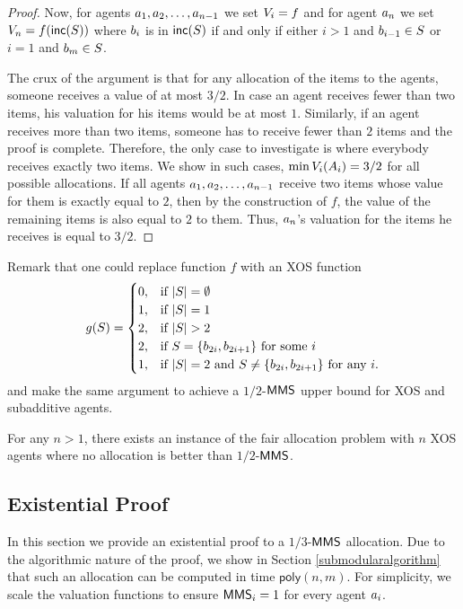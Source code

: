 \begin{proof}
	 Now, for agents $a_1, a_2, \ldots, a_{n-1}$ we set $V_i = f$ and for agent $a_n$ we set $V_n = f(\mathsf{inc}(S))$ where $b_i$ is in $\mathsf{inc}(S)$ if and only if either $i > 1$ and $b_{i-1} \in S$ or $i=1$ and $b_m \in S$. 
	
	The crux of the argument is that for any allocation of the items to the agents, someone receives a value of at most $3/2$. In case an agent receives fewer than two items, his valuation for his items would be at most $1$. Similarly, if an agent receives more than two items, someone has to receive fewer than $2$ items and the proof is complete. Therefore, the only case to investigate is where everybody receives exactly two items. We show in such cases, $\min V_i(A_i) = 3/2$ for all possible allocations. If all agents $a_1, a_2, \ldots, a_{n-1}$ receive two items whose value for them is exactly equal to $2$, then by the construction of $f$, the value of the remaining items is also equal to $2$ to them. Thus, $a_n$'s valuation for the items he receives is equal to $3/2$.
\end{proof}
 
Remark that one could replace function $f$ with an XOS function 
	$$g(S) =
	\begin{cases}
	0, & \text{if }|S| = \emptyset \\
	1, & \text{if }|S| = 1  \\
	2, & \text{if }|S| > 2 \\
	2, & \text{if }S = \{b_{2i}, b_{2i+1} \} \text{ for some }i \\
	1, & \text{if }|S| = 2 \text{ and }S \neq \{b_{2i}, b_{2i+1} \} \text{ for any }i. \\
	\end{cases}$$
and make the same argument to achieve a $1/2$-$\mathsf{MMS}$ upper bound for XOS and subadditive agents.

\begin{theorem}\label{xosupperbound}
	For any $n > 1$, there exists an instance of the fair allocation problem with $n$ XOS agents where no allocation is better than $1/2$-$\mathsf{MMS}$.
\end{theorem}

\subsection{Existential Proof}\label{submodularep}
In this section we provide an existential proof to a $1/3$-$\mathsf{MMS}$ allocation. Due to the algorithmic nature of the proof, we show in Section \ref{submodularalgorithm} that such an allocation can be computed in time $\mathsf{poly}(n,m)$. For simplicity, we scale the valuation functions to ensure $\mathsf{MMS}_i = 1$ for every agent $a_i$.

